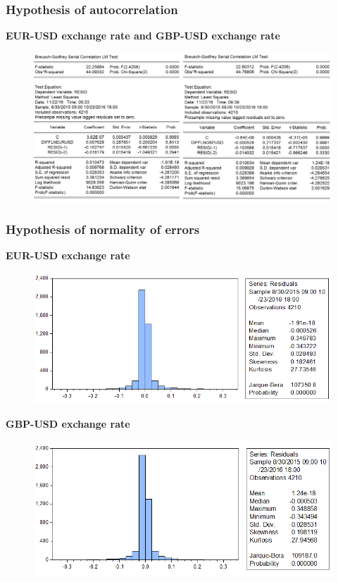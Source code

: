 \documentclass[11pt]{report}
\begin{document}
\subsubsection*{Hypothesis of autocorrelation}
\textbf{EUR-USD exchange rate and GBP-USD exchange rate}
\begin{figure}[!h]
\includegraphics[scale=1.1]{Appendix/chap3/10}
\end{figure}
\clearpage

\subsubsection*{Hypothesis of normality of errors}
\textbf{EUR-USD exchange rate}
\begin{figure}[!h]
\includegraphics[scale=1.2]{Appendix/chap3/11}
\end{figure}
\smallbreak
\textbf{GBP-USD exchange rate }
\begin{figure}[!h]
\includegraphics[scale=1.2]{Appendix/chap3/12}
\end{figure}
\clearpage
\end{document}

